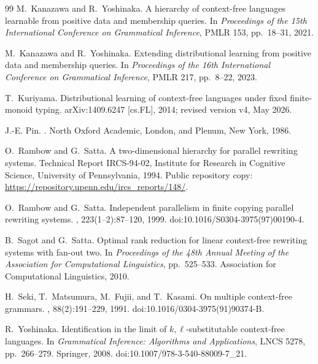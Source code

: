 \documentclass[11pt,a4paper]{article}
\numberwithin{equation}{section}
\theoremstyle{plain}
\theoremstyle{definition}
\theoremstyle{remark}
\begin{document}
\begin{thebibliography}{99}
M.~Kanazawa and R.~Yoshinaka.
\newblock A hierarchy of context-free languages learnable from positive data
and membership queries.
\newblock In {\em Proceedings of the 15th International Conference on
Grammatical Inference}, PMLR 153, pp.~18--31, 2021.

M.~Kanazawa and R.~Yoshinaka.
\newblock Extending distributional learning from positive data and membership
queries.
\newblock In {\em Proceedings of the 16th International Conference on
Grammatical Inference}, PMLR 217, pp.~8--22, 2023.

T.~Kuriyama.
\newblock Distributional learning of context-free languages under fixed finite-monoid typing.
\newblock arXiv:1409.6247 [cs.FL], 2014; revised version v4, May 2026.

J.-E. Pin.
.
\newblock North Oxford Academic, London, and Plenum, New York, 1986.

O.~Rambow and G.~Satta.
\newblock A two-dimensional hierarchy for parallel rewriting systems.
\newblock Technical Report IRCS-94-02, Institute for Research in Cognitive
Science, University of Pennsylvania, 1994.
\newblock Public repository copy:
\url{https://repository.upenn.edu/ircs_reports/148/}.

O.~Rambow and G.~Satta.
\newblock Independent parallelism in finite copying parallel rewriting systems.
, 223(1--2):87--120, 1999.
\newblock doi:10.1016/S0304-3975(97)00190-4.

B.~Sagot and G.~Satta.
\newblock Optimal rank reduction for linear context-free rewriting systems with fan-out two.
\newblock In {\em Proceedings of the 48th Annual Meeting of the Association for
Computational Linguistics}, pp.~525--533. Association for Computational Linguistics, 2010.

H.~Seki, T.~Matsumura, M.~Fujii, and T.~Kasami.
\newblock On multiple context-free grammars.
, 88(2):191--229, 1991.
\newblock doi:10.1016/0304-3975(91)90374-B.

R.~Yoshinaka.
\newblock Identification in the limit of \(k,\ell\)-substitutable context-free
 languages.
\newblock In {\em Grammatical Inference: Algorithms and Applications},
 LNCS 5278, pp.~266--279. Springer, 2008.
\newblock doi:10.1007/978-3-540-88009-7\_21.


\end{thebibliography}
\end{document}
